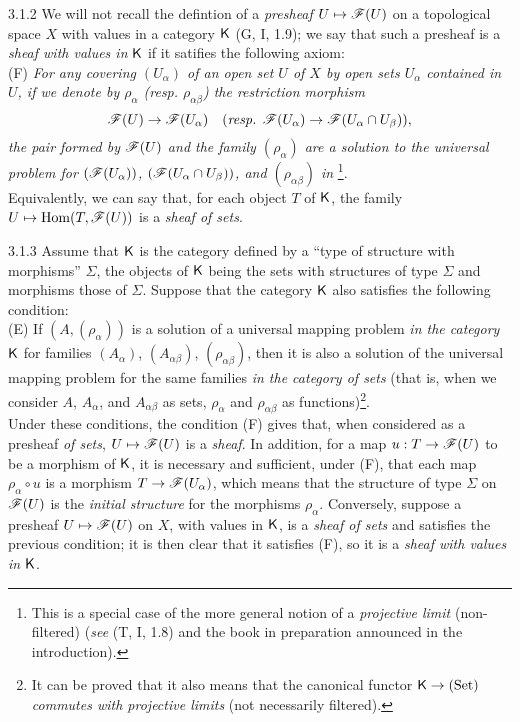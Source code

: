 \begin{env}{3.1.2}
\label{env-0.3.1.2}
We will not recall the defintion of a \emph{presheaf} $U\mapsto\mathscr{F}(U)$ on a topological
space $X$ with values in a category $\mathsf{K}$ (G, I, 1.9); we say that such a presheaf is a
\emph{sheaf with values in} $\mathsf{K}$ if it satifies the following axiom:\\

(F) \emph{For any covering $(U_\alpha)$ of an open set $U$ of $X$ by open sets $U_\alpha$
    contained in $U$, if we denote by $\rho_\alpha$ (resp. $\rho_{\alpha\beta}$) the
    restriction morphism}
    \[
      \mathscr{F}(U)\to\mathscr{F}(U_\alpha)
      \quad(\text{\emph{resp. }}\mathscr{F}(U_\alpha)\to\mathscr{F}(U_\alpha\cap U_\beta)),
    \]
    \emph{the pair formed by $\mathscr{F}(U)$ and the family $(\rho_\alpha)$ are a solution to
    the universal problem for $(\mathscr{F}(U_\alpha))$, $(\mathscr{F}(U_\alpha\cap U_\beta))$, and
    $(\rho_{\alpha\beta})$ in} \footnote{This is a special case of the more
    general notion of a \emph{projective limit} (non-filtered) (\emph{see} (T, I, 1.8) and
    the book in preparation announced in the introduction).}.\\

Equivalently, we can say that, for each object $T$ of $\mathsf{K}$, the family
$U\mapsto{\mathop{\mathrm{Hom}}\nolimits}(T,\mathscr{F}(U))$ is a \emph{sheaf of sets}.
\end{env}

\begin{env}{3.1.3}
\label{env-0.3.1.3}
Assume that $\mathsf{K}$ is the category defined by a ``type of structure with morphisms''
$\Sigma$,
the objects of $\mathsf{K}$ being the sets with structures of type $\Sigma$ and morphisms those of
$\Sigma$. Suppose that the category $\mathsf{K}$ also satisfies the following condition:\\

(E) If $(A,(\rho_\alpha))$ is a solution of a universal mapping problem \emph{in the
    category $\mathsf{K}$} for families $(A_\alpha)$, $(A_{\alpha\beta})$, $(\rho_{\alpha\beta})$,
    then it is also a solution of the universal mapping problem for the same families
    \emph{in the category of sets} (that is, when we consider $A$, $A_\alpha$, and
    $A_{\alpha\beta}$ as sets, $\rho_\alpha$ and $\rho_{\alpha\beta}$ as
    functions)\footnote{It can be proved that it also means that the canonical functor
    $\mathsf{K}\to(\mathrm{Set})$ \emph{commutes with projective limits} (not necessarily
    filtered).}.\\

Under these conditions, the condition (F) gives that, when considered as a presheaf \emph{of
sets}, $U\mapsto\mathscr{F}(U)$ is a \emph{sheaf}. In addition, for a map $u:T\to\mathscr{F}(U)$ to be
a morphism of $\mathsf{K}$, it is necessary and sufficient, under (F), that each map
$\rho_\alpha\circ u$ is a morphism $T\to\mathscr{F}(U_\alpha)$, which means that the structure of
type $\Sigma$ on $\mathscr{F}(U)$ is the \emph{initial structure} for the morphisms $\rho_\alpha$.
Conversely, suppose a presheaf $U\mapsto\mathscr{F}(U)$ on $X$, with values in $\mathsf{K}$, is a
\emph{sheaf of sets} and satisfies the previous condition; it is then clear that it satisfies
(F), so it is a \emph{sheaf with values in} $\mathsf{K}$.
\end{env}

